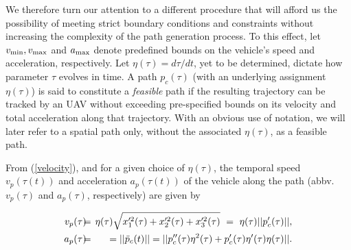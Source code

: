 \documentclass[]{aiaa-tc}%
\begin{document}
We therefore turn our attention to a different procedure that will afford us
the possibility of meeting strict boundary conditions and constraints
without increasing the complexity of the path generation process. To this
effect, let $v_{{\rm min}}, v_{{\rm max}}$ and $a_{{\rm max}}$ denote
predefined bounds on the vehicle's speed and acceleration, respectively. Let
$\eta(\tau) = d\tau/dt$, yet to be determined, dictate how parameter $\tau$
evolves in time. A path $p_c(\tau)$ (with an underlying assignment
$\eta(\tau)$) is said to constitute a \textit{feasible} path if the
resulting trajectory can be tracked by an UAV without exceeding
pre-specified bounds on its velocity and total acceleration along that
trajectory. With an obvious use of notation, we will later refer to a
spatial path only, without the associated $\eta(\tau)$, as a feasible path.

From (\ref{velocity}), and for a given choice of $\eta(\tau)$, the temporal
speed $v_p(\tau(t))$ and acceleration $a_p(\tau(t))$ of the vehicle along
the path (abbv. $v_p(\tau)$ and $a_p(\tau)$, respectively) are given by

\begin{eqnarray} \nonumber
v_p(\tau) \hspace{ -0.2 cm} &=& \hspace{ -0.2 cm} \eta(\tau)
\sqrt{x'^2_{1}(\tau) + x'^2_{2}(\tau) + x'^2_{3}(\tau)} ~ = ~
\eta(\tau) ||p'_c(\tau)||, \\
\label{velacc} a_p(\tau) \hspace{ -0.2 cm} &=& \hspace{ -0.2 cm}
=||\ddot{p}_c(t) || = ||p''_c(\tau) \eta^2(\tau) + p'_c(\tau) \eta'(\tau)  \eta(\tau)||.
\end{eqnarray}
\end{document}
